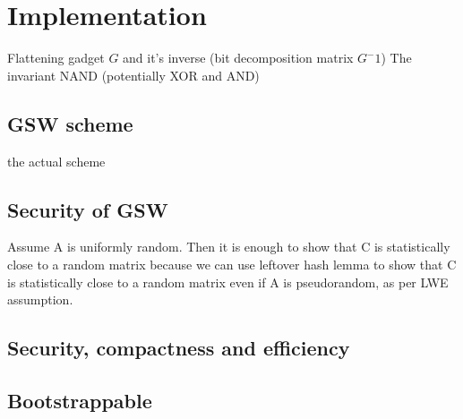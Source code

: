 \chapter{Implementation}

Flattening gadget $G$ and it's inverse (bit decomposition matrix $G^-1$)
The invariant
NAND (potentially XOR and AND)

\section{GSW scheme}
the actual scheme

\section{Security of GSW}
Assume A is uniformly random. Then it is enough to show that C is statistically close to a random matrix because we can use leftover hash lemma to show that C is statistically close to a random matrix even if A is pseudorandom, as per LWE assumption. 

\section{Security, compactness and efficiency}
\section{Bootstrappable}

